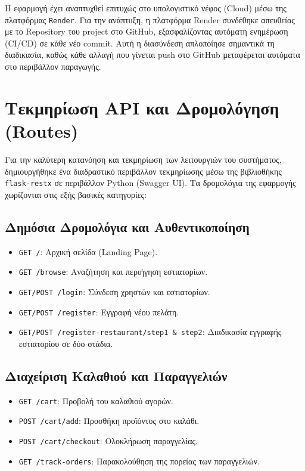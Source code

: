 \documentclass[acmsmall,screen,nonacm]{acmart}
\begin{document}
	Η εφαρμογή έχει αναπτυχθεί επιτυχώς στο υπολογιστικό νέφος (Cloud) μέσω της πλατφόρμας \texttt{Render}. Για την ανάπτυξη, η πλατφόρμα Render συνδέθηκε απευθείας με το Repository του project στο GitHub, εξασφαλίζοντας αυτόματη ενημέρωση (CI/CD) σε κάθε νέο commit. Αυτή η διασύνδεση απλοποίησε σημαντικά τη διαδικασία, καθώς κάθε αλλαγή που γίνεται push στο GitHub μεταφέρεται αυτόματα στο περιβάλλον παραγωγής.

	\section{Τεκμηρίωση API και Δρομολόγηση (Routes)}
	Για την καλύτερη κατανόηση και τεκμηρίωση των λειτουργιών του συστήματος, δημιουργήθηκε ένα διαδραστικό περιβάλλον τεκμηρίωσης μέσω της βιβλιοθήκης \texttt{flask-restx} σε περιβάλλον Python (Swagger UI). Τα δρομολόγια της εφαρμογής χωρίζονται στις εξής βασικές κατηγορίες:

	\subsection{Δημόσια Δρομολόγια και Αυθεντικοποίηση}
	\begin{itemize}
		\item \texttt{GET /}: Αρχική σελίδα (Landing Page).
		\item \texttt{GET /browse}: Αναζήτηση και περιήγηση εστιατορίων.
		\item \texttt{GET/POST /login}: Σύνδεση χρηστών και εστιατορίων.
		\item \texttt{GET/POST /register}: Εγγραφή νέου πελάτη.
		\item \texttt{GET/POST /register-restaurant/step1 \& step2}: Διαδικασία εγγραφής εστιατορίου σε δύο στάδια.
	\end{itemize}

	\subsection{Διαχείριση Καλαθιού και Παραγγελιών}
	\begin{itemize}
		\item \texttt{GET /cart}: Προβολή του καλαθιού αγορών.
		\item \texttt{POST /cart/add}: Προσθήκη προϊόντος στο καλάθι.
		\item \texttt{POST /cart/checkout}: Ολοκλήρωση παραγγελίας.
		\item \texttt{GET /track-orders}: Παρακολούθηση της πορείας των παραγγελιών.
	\end{itemize}
\end{document}

